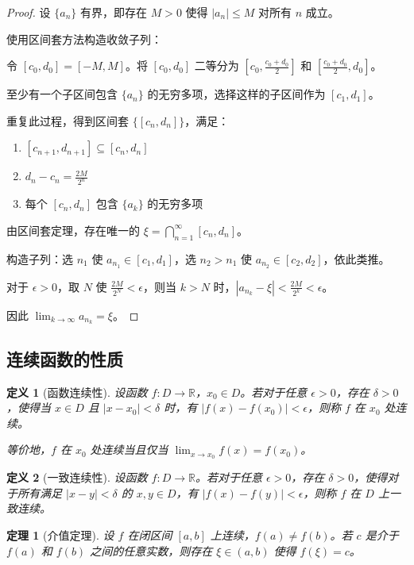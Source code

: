 \documentclass[12pt]{article}
\newtheorem{theorem}{定理}[section]
\newtheorem{definition}{定义}[section]
\begin{document}
\begin{proof}
设 $\{a_n\}$ 有界，即存在 $M > 0$ 使得 $|a_n| \leq M$ 对所有 $n$ 成立。

使用区间套方法构造收敛子列：

令 $[c_0, d_0] = [-M, M]$。将 $[c_0, d_0]$ 二等分为 $[c_0, \frac{c_0+d_0}{2}]$ 和 $[\frac{c_0+d_0}{2}, d_0]$。

至少有一个子区间包含 $\{a_n\}$ 的无穷多项，选择这样的子区间作为 $[c_1, d_1]$。

重复此过程，得到区间套 $\{[c_n, d_n]\}$，满足：
\begin{enumerate}
\item $[c_{n+1}, d_{n+1}] \subseteq [c_n, d_n]$
\item $d_n - c_n = \frac{2M}{2^n}$
\item 每个 $[c_n, d_n]$ 包含 $\{a_k\}$ 的无穷多项
\end{enumerate}

由区间套定理，存在唯一的 $\xi = \bigcap_{n=1}^{\infty} [c_n, d_n]$。

构造子列：选 $n_1$ 使 $a_{n_1} \in [c_1, d_1]$，选 $n_2 > n_1$ 使 $a_{n_2} \in [c_2, d_2]$，依此类推。

对于 $\epsilon > 0$，取 $N$ 使 $\frac{2M}{2^N} < \epsilon$，则当 $k > N$ 时，$|a_{n_k} - \xi| < \frac{2M}{2^k} < \epsilon$。

因此 $\lim_{k \to \infty} a_{n_k} = \xi$。
\end{proof}

\subsection{连续函数的性质}

\begin{definition}[函数连续性]
设函数 $f: D \to \mathbb{R}$，$x_0 \in D$。若对于任意 $\epsilon > 0$，存在 $\delta > 0$，使得当 $x \in D$ 且 $|x - x_0| < \delta$ 时，有 $|f(x) - f(x_0)| < \epsilon$，则称 $f$ 在 $x_0$ 处连续。

等价地，$f$ 在 $x_0$ 处连续当且仅当 $\lim_{x \to x_0} f(x) = f(x_0)$。
\end{definition}

\begin{definition}[一致连续性]
设函数 $f: D \to \mathbb{R}$。若对于任意 $\epsilon > 0$，存在 $\delta > 0$，使得对于所有满足 $|x - y| < \delta$ 的 $x, y \in D$，有 $|f(x) - f(y)| < \epsilon$，则称 $f$ 在 $D$ 上一致连续。
\end{definition}

\begin{theorem}[介值定理]
设 $f$ 在闭区间 $[a, b]$ 上连续，$f(a) \neq f(b)$。若 $c$ 是介于 $f(a)$ 和 $f(b)$ 之间的任意实数，则存在 $\xi \in (a, b)$ 使得 $f(\xi) = c$。
\end{theorem}
\end{document}
